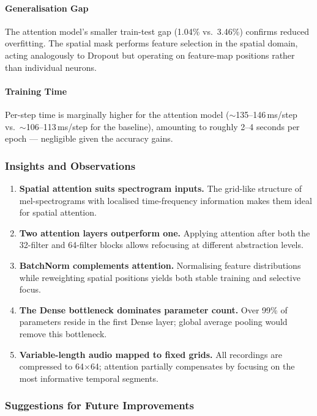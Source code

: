 \paragraph{Generalisation Gap}

The attention model's smaller train-test gap (1.04\% vs.\ 3.46\%) confirms reduced
overfitting. The spatial mask performs feature selection in the spatial domain,
acting analogously to Dropout but operating on feature-map positions rather than
individual neurons.

\paragraph{Training Time}

Per-step time is marginally higher for the attention model ($\sim$135--146\,ms/step
vs.\ $\sim$106--113\,ms/step for the baseline), amounting to roughly 2--4 seconds
per epoch --- negligible given the accuracy gains.

\subsubsection{Insights and Observations}

\begin{enumerate}[leftmargin=1.5em]
    \item \textbf{Spatial attention suits spectrogram inputs.} The grid-like structure
	    of mel-spectrograms with localised time-frequency information makes them
	    ideal for spatial attention.
    \item \textbf{Two attention layers outperform one.} Applying attention after both
	    the 32-filter and 64-filter blocks allows refocusing at different abstraction
	    levels.
    \item \textbf{BatchNorm complements attention.} Normalising feature distributions
	    while reweighting spatial positions yields both stable training and selective
	    focus.
    \item \textbf{The Dense bottleneck dominates parameter count.} Over 99\% of
	    parameters reside in the first Dense layer; global average pooling would
	    remove this bottleneck.
    \item \textbf{Variable-length audio mapped to fixed grids.} All recordings are
	    compressed to 64$\times$64; attention partially compensates by focusing on
	    the most informative temporal segments.
\end{enumerate}

\subsubsection{Suggestions for Future Improvements}

